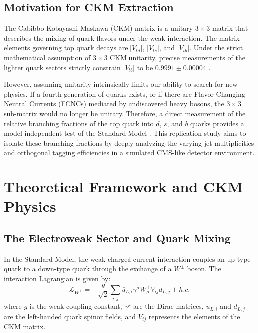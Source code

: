 \documentclass[11pt,a4paper]{article}
\begin{document}
\subsection{Motivation for CKM Extraction}
The Cabibbo-Kobayashi-Maskawa (CKM) matrix is a unitary $3\times3$ matrix that describes the mixing of quark flavors under the weak interaction. The matrix elements governing top quark decays are $|V_{td}|$, $|V_{ts}|$, and $|V_{tb}|$. Under the strict mathematical assumption of $3\times3$ CKM unitarity, precise measurements of the lighter quark sectors strictly constrain $|V_{tb}|$ to be $0.9991 \pm 0.00004$ \cite{pdg}. 

However, assuming unitarity intrinsically limits our ability to search for new physics. If a fourth generation of quarks exists, or if there are Flavor-Changing Neutral Currents (FCNCs) mediated by undiscovered heavy bosons, the $3\times3$ sub-matrix would no longer be unitary. Therefore, a direct measurement of the relative branching fractions of the top quark into $d$, $s$, and $b$ quarks provides a model-independent test of the Standard Model \cite{cms_paper}. This replication study aims to isolate these branching fractions by deeply analyzing the varying jet multiplicities and orthogonal tagging efficiencies in a simulated CMS-like detector environment.

\section{Theoretical Framework and CKM Physics}

\subsection{The Electroweak Sector and Quark Mixing}
In the Standard Model, the weak charged current interaction couples an up-type quark to a down-type quark through the exchange of a $W^{\pm}$ boson. The interaction Lagrangian is given by:
\begin{equation}
\mathcal{L}_{W^{\pm}} = -\frac{g}{\sqrt{2}} \sum_{i,j} \bar{u}_{L,i} \gamma^{\mu} W_{\mu}^{+} V_{ij} d_{L,j} + h.c.
\end{equation}
where $g$ is the weak coupling constant, $\gamma^{\mu}$ are the Dirac matrices, $u_{L,i}$ and $d_{L,j}$ are the left-handed quark spinor fields, and $V_{ij}$ represents the elements of the CKM matrix.
\end{document}
